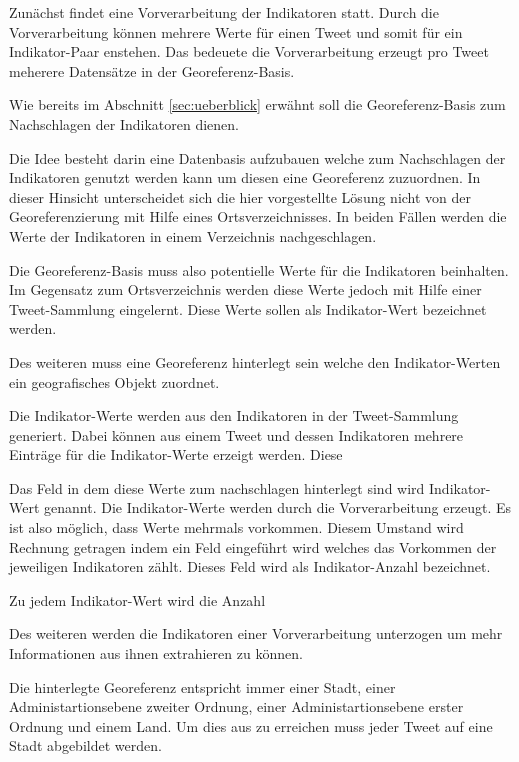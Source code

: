 				
				  

				Zunächst findet eine Vorverarbeitung der Indikatoren statt. 
				Durch die Vorverarbeitung können mehrere Werte für einen Tweet und somit für ein Indikator-Paar enstehen. 
				Das bedeuete die Vorverarbeitung erzeugt pro Tweet meherere Datensätze in der Georeferenz-Basis.

				Wie bereits im Abschnitt \ref{sec:ueberblick} erwähnt soll die Georeferenz-Basis zum Nachschlagen der Indikatoren dienen.  

				Die Idee besteht darin eine Datenbasis aufzubauen welche zum Nachschlagen der Indikatoren genutzt werden kann um diesen eine Georeferenz zuzuordnen.
				In dieser Hinsicht unterscheidet sich die hier vorgestellte Lösung nicht von der Georeferenzierung mit Hilfe eines Ortsverzeichnisses.
				In beiden Fällen werden die Werte der Indikatoren in einem Verzeichnis nachgeschlagen. 
				
				Die Georeferenz-Basis muss also potentielle Werte für die Indikatoren beinhalten.
				Im Gegensatz zum Ortsverzeichnis werden diese Werte jedoch mit Hilfe einer Tweet-Sammlung eingelernt.
				Diese Werte sollen als Indikator-Wert bezeichnet werden.

				Des weiteren muss eine Georeferenz hinterlegt sein welche den Indikator-Werten ein geografisches Objekt zuordnet.

				
				Die Indikator-Werte werden aus den Indikatoren in der Tweet-Sammlung generiert.
				Dabei können aus einem Tweet und dessen Indikatoren mehrere Einträge für die Indikator-Werte erzeigt werden. 
				Diese  

				Das Feld in dem diese Werte zum nachschlagen hinterlegt sind wird Indikator-Wert genannt. 
				Die Indikator-Werte werden durch die Vorverarbeitung erzeugt.   
				Es ist also möglich, dass Werte mehrmals vorkommen. 
				Diesem Umstand wird Rechnung getragen indem ein Feld eingeführt wird welches das Vorkommen der jeweiligen Indikatoren zählt. 
				Dieses Feld wird als Indikator-Anzahl bezeichnet.

				Zu jedem Indikator-Wert wird die Anzahl 

				Des weiteren werden die Indikatoren einer Vorverarbeitung unterzogen um mehr Informationen aus ihnen extrahieren zu können. 

				Die hinterlegte Georeferenz entspricht immer einer Stadt, einer Administartionsebene zweiter Ordnung, einer Administartionsebene erster Ordnung und einem Land. 
				Um dies aus zu erreichen muss jeder Tweet auf eine Stadt abgebildet werden.



